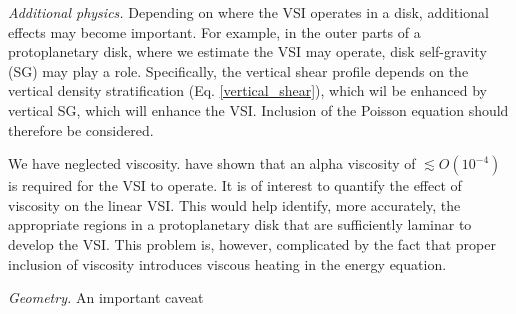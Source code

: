 \emph{Additional physics.} Depending on where the VSI operates in a
disk, additional effects may become important. For example, in the
outer parts of a protoplanetary disk, where we estimate the VSI may
operate, disk self-gravity (SG) may play a role. Specifically, the vertical
shear profile depends on the vertical density stratification
(Eq. \ref{vertical_shear}), which wil be enhanced by vertical SG,
which will enhance the VSI. Inclusion of the Poisson equation should
therefore be considered. 

We have neglected viscosity. \cite{nelson13} have shown that an
alpha viscosity of $\lesssim O(10^{-4})$ is required for the VSI to
operate. It is of interest to quantify the effect of viscosity
on the linear VSI. This would help identify, more accurately, the
appropriate regions in a protoplanetary disk that are sufficiently
laminar to develop the VSI.  This problem is, however, complicated by
the fact that proper inclusion of viscosity introduces viscous heating
in the energy equation. 


\emph{Geometry.} An important caveat 






